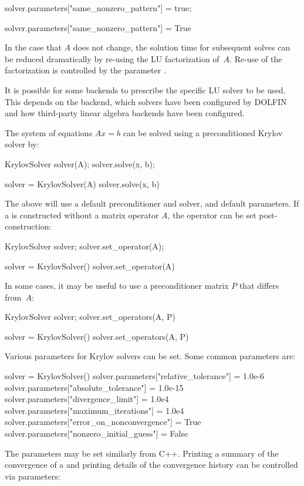 \begin{c++}
solver.parameters["same_nonzero_pattern"] = true;
\end{c++}

\begin{python}
solver.parameters["same_nonzero_pattern"] = True
\end{python}
In the case that $A$ does not change, the solution time for subsequent
solves can be reduced dramatically by re-using the LU factorization
of~$A$.  Re-use of the factorization is controlled by the parameter
.

It is possible for some backends to prescribe the specific LU solver
to be used. This depends on the backend, which solvers have been
configured by DOLFIN and how third-party linear algebra backends have
been configured.

The system of equations $Ax = b$ can be solved using a preconditioned
Krylov solver by:

\begin{c++}
KrylovSolver solver(A);
solver.solve(x, b);
\end{c++}

\begin{python}
solver = KrylovSolver(A)
solver.solve(x, b)
\end{python}
The above will use a default preconditioner and solver, and default
parameters. If a  is constructed without a matrix
operator $A$, the operator can be set post-construction:

\begin{c++}
KrylovSolver solver;
solver.set_operator(A);
\end{c++}

\begin{python}
solver = KrylovSolver()
solver.set_operator(A)
\end{python}
In some cases, it may be useful to use a preconditioner matrix $P$ that
differs from~$A$:

\begin{c++}
KrylovSolver solver;
solver.set_operators(A, P)
\end{c++}

\begin{python}
solver = KrylovSolver()
solver.set_operators(A, P)
\end{python}
Various parameters for Krylov solvers can be set. Some common parameters
are:

\begin{python}
solver = KrylovSolver()
solver.parameters["relative_tolerance"]      = 1.0e-6
solver.parameters["absolute_tolerance"]      = 1.0e-15
solver.parameters["divergence_limit"]        = 1.0e4
solver.parameters["maximum_iterations"]      = 1.0e4
solver.parameters["error_on_nonconvergence"] = True
solver.parameters["nonzero_initial_guess"]   = False
\end{python}
The parameters may be set similarly from C++. Printing a summary of
the convergence of a  and printing details of the
convergence history can be controlled via parameters:

